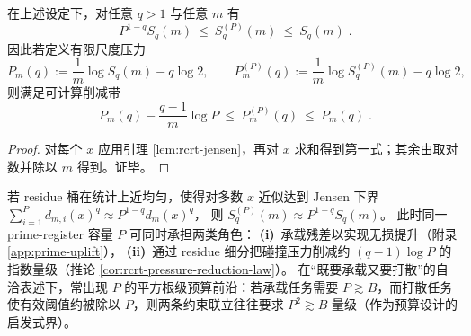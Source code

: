 \begin{corollary}[压力削减的显式律]\label{cor:rcrt-pressure-reduction-law}
在上述设定下，对任意 \(q>1\) 与任意 \(m\) 有
$$
\boxed{\;
P^{1-q}S_q(m)\ \le\ S_q^{(P)}(m)\ \le\ S_q(m)\; }.
$$
因此若定义有限尺度压力
$$
P_m(q):=\frac{1}{m}\log S_q(m)-q\log 2,\qquad
P_m^{(P)}(q):=\frac{1}{m}\log S_q^{(P)}(m)-q\log 2,
$$
则满足可计算削减带
$$
\boxed{\;
P_m(q)-\frac{q-1}{m}\log P\ \le\ P_m^{(P)}(q)\ \le\ P_m(q)\; }.
$$
\end{corollary}
\begin{proof}
对每个 \(x\) 应用引理 \ref{lem:rcrt-jensen}，再对 \(x\) 求和得到第一式；其余由取对数并除以 \(m\) 得到。证毕。
\end{proof}

\begin{remark}\label{rem:rcrt-self-consistent-sqrt}
若 residue 桶在统计上近均匀，使得对多数 \(x\) 近似达到 Jensen 下界
\(
\sum_{i=1}^{P}d_{m,i}(x)^q\approx P^{1-q}d_m(x)^q
\)，
则 \(S_q^{(P)}(m)\approx P^{1-q}S_q(m)\)。
此时同一 prime-register 容量 \(P\) 可同时承担两类角色：
\textbf{(i)}~承载残差以实现无损提升（附录 \ref{app:prime-uplift}），
\textbf{(ii)}~通过 residue 细分把碰撞压力削减约 \((q-1)\log P\) 的指数量级（推论 \ref{cor:rcrt-pressure-reduction-law}）。
在“既要承载又要打散”的自洽表述下，常出现 \(P\) 的平方根级预算前沿：若承载任务需要 \(P\gtrsim B\)，而打散任务使有效阈值约被除以 \(P\)，则两条约束联立往往要求 \(P^2\gtrsim B\) 量级（作为预算设计的启发式界）。
\end{remark}

